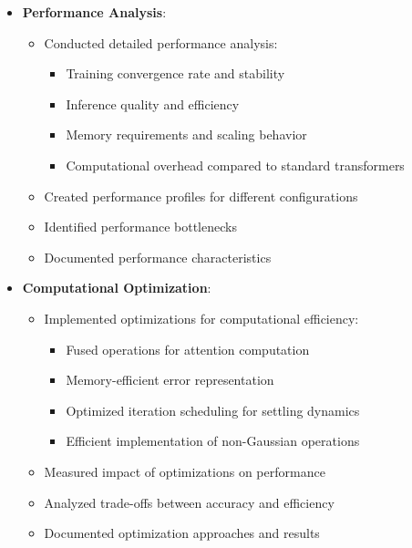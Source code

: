\documentclass{article}
\begin{document}
\begin{itemize}
  \item \textbf{Performance Analysis}:
  \begin{itemize}
    \item Conducted detailed performance analysis:
    \begin{itemize}
      \item Training convergence rate and stability
      \item Inference quality and efficiency
      \item Memory requirements and scaling behavior
      \item Computational overhead compared to standard transformers
    \end{itemize}
    \item Created performance profiles for different configurations
    \item Identified performance bottlenecks
    \item Documented performance characteristics
  \end{itemize}

  \item \textbf{Computational Optimization}:
  \begin{itemize}
    \item Implemented optimizations for computational efficiency:
    \begin{itemize}
      \item Fused operations for attention computation
      \item Memory-efficient error representation
      \item Optimized iteration scheduling for settling dynamics
      \item Efficient implementation of non-Gaussian operations
    \end{itemize}
    \item Measured impact of optimizations on performance
    \item Analyzed trade-offs between accuracy and efficiency
    \item Documented optimization approaches and results
  \end{itemize}


\end{itemize}
\end{document}
